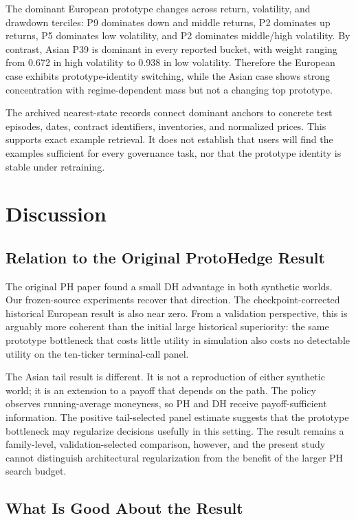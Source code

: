 \documentclass[conference]{IEEEtran}
\begin{document}
The dominant European prototype changes across return, volatility, and
drawdown terciles: P9 dominates down and middle returns, P2 dominates up
returns, P5 dominates low volatility, and P2 dominates middle/high volatility.
By contrast, Asian P39 is dominant in every reported bucket, with weight
ranging from 0.672 in high volatility to 0.938 in low volatility. Therefore the
European case exhibits prototype-identity switching, while the Asian case
shows strong concentration with regime-dependent mass but not a changing top
prototype.

The archived nearest-state records connect dominant anchors to concrete test
episodes, dates, contract identifiers, inventories, and normalized prices. This
supports exact example retrieval. It does not establish that users will find
the examples sufficient for every governance task, nor that the prototype
identity is stable under retraining.

\section{Discussion}

\subsection{Relation to the Original ProtoHedge Result}

The original PH paper found a small DH advantage in both synthetic worlds.
Our frozen-source experiments recover that direction. The checkpoint-corrected
historical European result is also near zero. From a validation perspective,
this is arguably more coherent than the initial large historical superiority:
the same prototype bottleneck that costs little utility in simulation also
costs no detectable utility on the ten-ticker terminal-call panel.

The Asian tail result is different. It is not a reproduction of either
synthetic world; it is an extension to a payoff that depends on the path. The
policy observes running-average moneyness, so PH and DH receive payoff-sufficient
information. The positive tail-selected panel estimate suggests that the
prototype bottleneck may regularize decisions usefully in this setting. The
result remains a family-level, validation-selected comparison, however, and
the present study cannot distinguish architectural regularization from the
benefit of the larger PH search budget.

\subsection{What Is Good About the Result}
\end{document}
